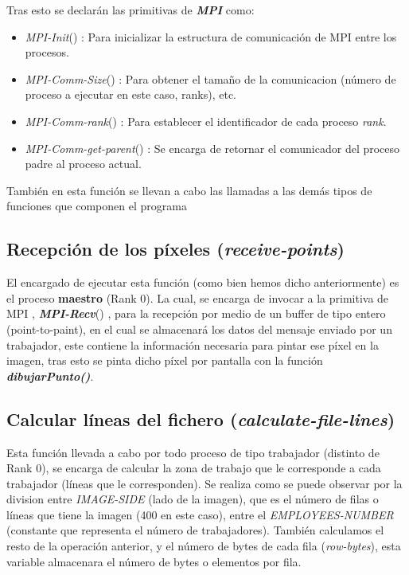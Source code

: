 \documentclass[11pt]{article}
\begin{document}
Tras esto se declarán las primitivas de \textit{\textbf{MPI}} como: 
\begin{itemize}
	\item \textit{MPI-Init}() \cite{transpas}: Para inicializar la estructura de comunicación de MPI entre los procesos. 
	\item \textit{MPI-Comm-Size}() \cite{transpas}: Para obtener el tamaño de la comunicacion (número de proceso a ejecutar en este caso, ranks), etc.
	\item \textit{MPI-Comm-rank}() \cite{transpas}: Para establecer el identificador de cada proceso \textit{rank}.
	\item \textit{MPI-Comm-get-parent}() \cite{org}: Se encarga de retornar el comunicador del proceso padre al proceso actual.
\end{itemize}

También en esta función se llevan a cabo las llamadas a las demás tipos de funciones que componen el programa



\subsection{Recepción de los píxeles (\textit{receive-points})}
El encargado de ejecutar esta función (como bien hemos dicho anteriormente) es el proceso \textbf{maestro} (Rank 0). La cual, se encarga de invocar a la primitiva de MPI \cite{org}, \textbf{\textit{MPI-Recv}}() \cite{org}, para la recepción por medio de un buffer de tipo entero (point-to-paint), en el cual se almacenará los datos del mensaje enviado por un trabajador, este contiene la información necesaria para pintar ese píxel en la imagen, tras esto se pinta dicho píxel por pantalla con la función \textit{\textbf{dibujarPunto()}}.



\subsection{Calcular líneas del fichero (\textit{calculate-file-lines})}
Esta función llevada a cabo por todo proceso de tipo trabajador (distinto de Rank 0), se encarga de calcular la zona de trabajo que le corresponde a cada trabajador (líneas que le corresponden). Se realiza como se puede observar por la division entre \textit{IMAGE-SIDE} (lado de la imagen), que es el número de filas o líneas que tiene la imagen (400 en este caso), entre el \textit{EMPLOYEES-NUMBER} (constante que representa el número de trabajadores). También calculamos el resto de la operación anterior, y el número de bytes de cada fila (\textit{row-bytes}), esta variable almacenara el número de bytes o elementos por fila.

\end{document}

